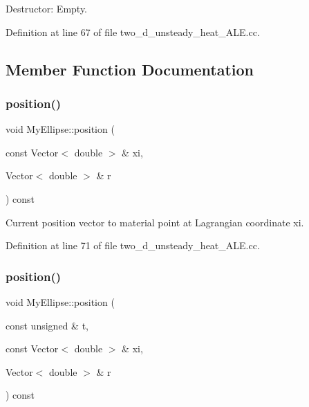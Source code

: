 Destructor\+: Empty. 



Definition at line 67 of file two\+\_\+d\+\_\+unsteady\+\_\+heat\+\_\+\+A\+L\+E.\+cc.



\subsection{Member Function Documentation}
\mbox{\label{classMyEllipse_a7b139a2f4564005773c83325f2414e3e}} 
\subsubsection{\texorpdfstring{position()}{position()}\hspace{0.1cm}{\footnotesize\ttfamily [1/2]}}
{\footnotesize\ttfamily void My\+Ellipse\+::position (\begin{DoxyParamCaption}\item[{const Vector$<$ double $>$ \&}]{xi,  }\item[{Vector$<$ double $>$ \&}]{r }\end{DoxyParamCaption}) const\hspace{0.3cm}{\ttfamily [inline]}}



Current position vector to material point at Lagrangian coordinate xi. 



Definition at line 71 of file two\+\_\+d\+\_\+unsteady\+\_\+heat\+\_\+\+A\+L\+E.\+cc.

\mbox{\label{classMyEllipse_a93f75bf33969037e35d779738a8493f5}} 
\subsubsection{\texorpdfstring{position()}{position()}\hspace{0.1cm}{\footnotesize\ttfamily [2/2]}}
{\footnotesize\ttfamily void My\+Ellipse\+::position (\begin{DoxyParamCaption}\item[{const unsigned \&}]{t,  }\item[{const Vector$<$ double $>$ \&}]{xi,  }\item[{Vector$<$ double $>$ \&}]{r }\end{DoxyParamCaption}) const\hspace{0.3cm}{\ttfamily [inline]}}



